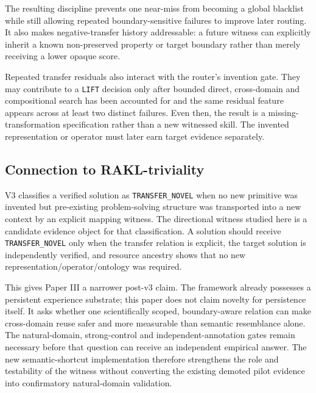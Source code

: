 The resulting discipline prevents one near-miss from becoming a global blacklist while still allowing repeated boundary-sensitive failures to improve later routing. It also makes negative-transfer history addressable: a future witness can explicitly inherit a known non-preserved property or target boundary rather than merely receiving a lower opaque score.

Repeated transfer residuals also interact with the router's invention gate. They may contribute to a \texttt{LIFT} decision only after bounded direct, cross-domain and compositional search has been accounted for and the same residual feature appears across at least two distinct failures. Even then, the result is a missing-transformation specification rather than a new witnessed skill. The invented representation or operator must later earn target evidence separately.

\subsection{Connection to RAKL-triviality}
V3 classifies a verified solution as \texttt{TRANSFER\_NOVEL} when no new primitive was invented but pre-existing problem-solving structure was transported into a new context by an explicit mapping witness. The directional witness studied here is a candidate evidence object for that classification. A solution should receive \texttt{TRANSFER\_NOVEL} only when the transfer relation is explicit, the target solution is independently verified, and resource ancestry shows that no new representation/operator/ontology was required.

This gives Paper III a narrower post-v3 claim. The framework already possesses a persistent experience substrate; this paper does not claim novelty for persistence itself. It asks whether one scientifically scoped, boundary-aware relation can make cross-domain reuse safer and more measurable than semantic resemblance alone. The natural-domain, strong-control and independent-annotation gates remain necessary before that question can receive an independent empirical answer. The new semantic-shortcut implementation therefore strengthens the role and testability of the witness without converting the existing demoted pilot evidence into confirmatory natural-domain validation.
